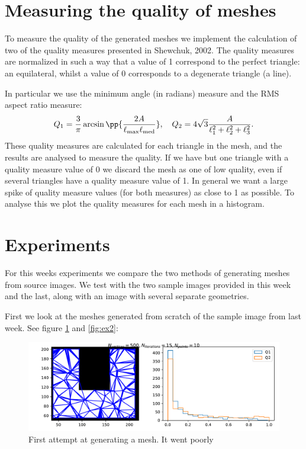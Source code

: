\documentclass[sigconf]{acmart}
\begin{document}
\section{Measuring the quality of meshes}
To measure the quality of the generated meshes we implement the calculation of two of the quality measures presented in Shewchuk, 2002. The quality measures are normalized in such a way that a value of 1 correspond to the perfect triangle: an equilateral, whilst a value of 0 corresponds to a degenerate triangle (a line).

In particular we use the minimum angle (in radians) measure and the RMS aspect ratio measure:
\begin{equation}\label{key}
	Q_1 = \frac{3}{\pi} \arcsin\pp{\frac{2A}{\ell_{\text{max}} \ell_{\text{med}}}}, \quad Q_2 = 4 \sqrt{3} \frac{A}{\ell_1^2 + \ell_2^2 + \ell_3^2}. 
\end{equation}
These quality measures are calculated for each triangle in the mesh, and the results are analysed to measure the quality. If we have but one triangle with a quality measure value of 0 we discard the mesh as one of low quality, even if several triangles have a quality measure value of 1. In general we want a large spike of quality measure values (for both measures) as close to 1 as possible. To analyse this we plot the quality measures for each mesh in a histogram.

\section{Experiments}
For this weeks experiments we compare the two methods of generating meshes from source images. We test with the two sample images provided in this week and the last, along with an image with several separate geometries.

First we look at the meshes generated from scratch of the sample image from last week. See figure \ref{fig:ex1} and \ref{fig:ex2}:
\begin{figure}
	\includegraphics[width=\linewidth]{ex1.pdf}
	\caption{First attempt at generating a mesh. It went poorly}
	\label{fig:ex1}
\end{figure}
\end{document}
